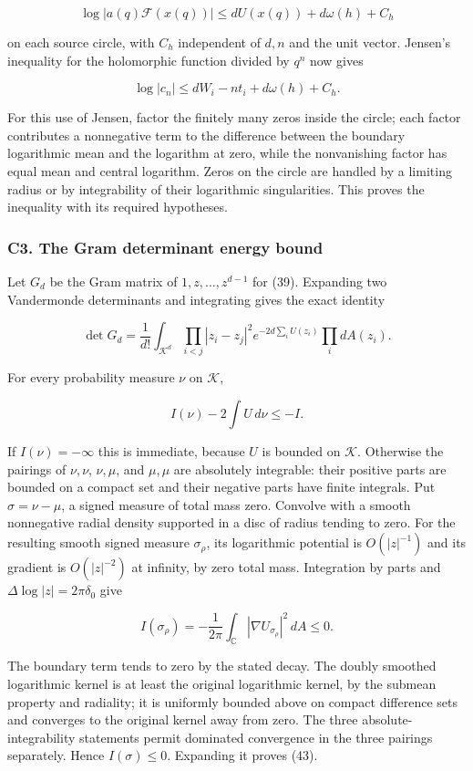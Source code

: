 \documentclass[11pt,a4paper]{article}
\begin{document}
\[
\log|a(q)\mathcal F(x(q))|
\le dU(x(q))+d\omega(h)+C_h
\]

on each source circle, with \(C_h\) independent of \(d,n\) and the unit vector. Jensen's inequality for the holomorphic function divided by \(q^n\) now gives

\[
\log|c_n|\le dW_i-nt_i+d\omega(h)+C_h.\tag{41}
\]

For this use of Jensen, factor the finitely many zeros inside the circle; each factor contributes a nonnegative term to the difference between the boundary logarithmic mean and the logarithm at zero, while the nonvanishing factor has equal mean and central logarithm. Zeros on the circle are handled by a limiting radius or by integrability of their logarithmic singularities. This proves the inequality with its required hypotheses.

\hypertarget{c3.-the-gram-determinant-energy-bound}{%
\subsubsection{C3. The Gram determinant energy bound}\label{c3.-the-gram-determinant-energy-bound}}

Let \(G_d\) be the Gram matrix of \(1,z,\ldots ,z^{d-1}\) for (39). Expanding two Vandermonde determinants and integrating gives the exact identity

\[
\det G_d=\frac1{d!}\int_{\mathcal K^d}
\prod_{i<j}|z_i-z_j|^2e^{-2d\sum_iU(z_i)}\prod_i dA(z_i).\tag{42}
\]

For every probability measure \(ν\) on \(\mathcal{K}\),

\[
I(\nu)-2\int U\,d\nu\le-I.\tag{43}
\]

If \(I(ν)=-∞\) this is immediate, because \(U\) is bounded on \(\mathcal{K}\). Otherwise the pairings of \(ν,ν\), \(ν,μ\), and \(μ,μ\) are absolutely integrable: their positive parts are bounded on a compact set and their negative parts have finite integrals. Put \(σ=ν-μ\), a signed measure of total mass zero. Convolve with a smooth nonnegative radial density supported in a disc of radius tending to zero. For the resulting smooth signed measure \(σ_ρ\), its logarithmic potential is \(O(|z|^{-1})\) and its gradient is \(O(|z|^{-2})\) at infinity, by zero total mass. Integration by parts and \(Δ \operatorname{log}|z|=2πδ_{0}\) give

\[
I(\sigma_\rho)=-\frac1{2\pi}\int_{\mathbb C}|\nabla U_{\sigma_\rho}|^2\,dA\le0.
\]

The boundary term tends to zero by the stated decay. The doubly smoothed logarithmic kernel is at least the original logarithmic kernel, by the submean property and radiality; it is uniformly bounded above on compact difference sets and converges to the original kernel away from zero. The three absolute-integrability statements permit dominated convergence in the three pairings separately. Hence \(I(σ)≤0\). Expanding it proves (43).
\end{document}

